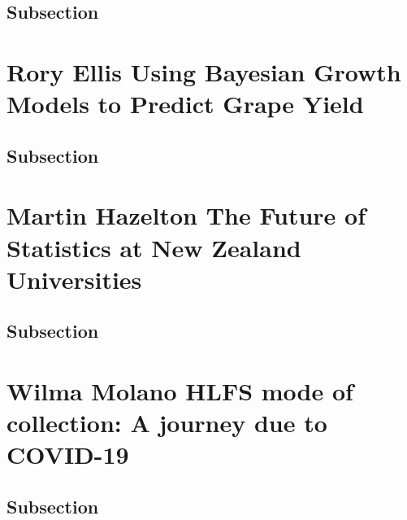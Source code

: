 \documentclass[
]{book}
\begin{document}
\hypertarget{subsection}{%
\section{Subsection}\label{subsection}}

\hypertarget{rory-ellis-using-bayesian-growth-models-to-predict-grape-yield}{%
\chapter*{Rory Ellis \textbar{} Using Bayesian Growth Models to Predict Grape Yield}\label{rory-ellis-using-bayesian-growth-models-to-predict-grape-yield}}

\hypertarget{subsection}{%
\section{Subsection}\label{subsection}}

\hypertarget{martin-hazelton-the-future-of-statistics-at-new-zealand-universities}{%
\chapter*{Martin Hazelton \textbar{} The Future of Statistics at New Zealand Universities}\label{martin-hazelton-the-future-of-statistics-at-new-zealand-universities}}

\hypertarget{subsection}{%
\section{Subsection}\label{subsection}}

\hypertarget{wilma-molano-hlfs-mode-of-collection-a-journey-due-to-covid-19}{%
\chapter*{Wilma Molano \textbar{} HLFS mode of collection: A journey due to COVID-19}\label{wilma-molano-hlfs-mode-of-collection-a-journey-due-to-covid-19}}

\hypertarget{subsection}{%
\section{Subsection}\label{subsection}}
\end{document}
